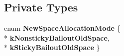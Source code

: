 \subsection*{Private Types}
\begin{DoxyCompactItemize}
\item 
enum {\bfseries New\+Space\+Allocation\+Mode} \{ \\*
{\bfseries k\+Nonsticky\+Bailout\+Old\+Space}, 
\\*
{\bfseries k\+Sticky\+Bailout\+Old\+Space}
 \}\hypertarget{classv8_1_1internal_1_1_mark_compact_collector_1_1_evacuate_new_space_visitor_a8f13df1516eec2e288ff0504392e5566}{}\label{classv8_1_1internal_1_1_mark_compact_collector_1_1_evacuate_new_space_visitor_a8f13df1516eec2e288ff0504392e5566}

\end{DoxyCompactItemize}
